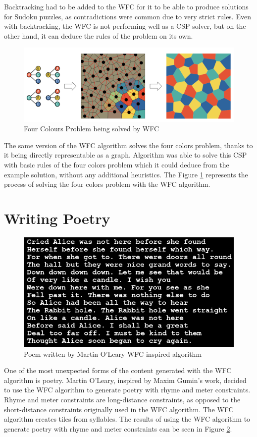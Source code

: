\documentclass[shortabstract, english, inz]{iithesis}
\begin{document}
Backtracking had to be added to the WFC for it to be able to produce solutions for Sudoku puzzles, as contradictions were common due to very strict rules. Even with backtracking, the WFC is not performing well as a CSP solver, but on the other hand, it can deduce the rules of the problem on its own. \cite{GraphBased}
\begin{figure}[H]
\centering
\includegraphics[width=1\textwidth, angle=0]{images/fourcolours.png}
\caption{Four Colours Problem being solved by WFC \cite{GraphBased}}
\label{fig:fourcolours}
\end{figure}
The same version of the WFC algorithm solves the four colors problem, thanks to it being directly representable as a graph. Algorithm was able to solve this CSP with basic rules of the four colors problem which it could deduce from the example solution, without any additional heuristics. \cite{GraphBased} The Figure \ref{fig:fourcolours} represents the process of solving the four colors problem with the WFC algorithm.


\section{Writing Poetry}
\begin{figure}[H]
\centering
\includegraphics[width=1\textwidth, angle=0]{images/poem.png}
\caption{Poem written by Martin O’Leary WFC inspired algorithm  \cite{wfcpoem}}
\label{fig:poem}
\end{figure}
One of the most unexpected forms of the content generated with the WFC algorithm is poetry. Martin O'Leary, inspired by Maxim Gumin's work, decided to use the WFC algorithm to generate poetry with rhyme and meter constraints. Rhyme and meter constraints are long-distance constraints, as opposed to the short-distance constraints originally used in the WFC algorithm. The WFC algorithm creates tiles from syllables. The results of using the WFC algorithm to generate poetry with rhyme and meter constraints can be seen in Figure \ref{fig:poem}. \cite{Smith, wfcpoem}
\end{document}
